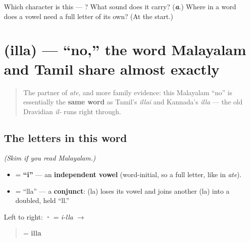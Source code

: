 \begin{tcolorbox}[breakable,colback=teal!4,colframe=teal!35!black,title={Before you move on}]
Which character is this — ? What sound does it carry? (\emph{\textbf{a}}.) Where in a word does a vowel need a full letter of its own? (At the start.)
\end{tcolorbox}
\section[\texorpdfstring{\ml{ഇല്ല} (illa)}{ഇല്ല (illa)}]{ (illa) — \textquotedblleft{}no,\textquotedblright{} the word Malayalam and Tamil share almost exactly}

\label{lesson:ML-C01-illa}



\begin{quote}
The partner of \emph{ate}, and more family evidence: this Malayalam \textquotedblleft{}no\textquotedblright{} is essentially the \textbf{same word} as Tamil's \emph{illai} and Kannada's \emph{illa} — the old Dravidian \emph{il-} runs right through.
\end{quote}

\subsection*{The letters in this word}
\emph{(Skim if you read Malayalam.)}

\begin{itemize}
\raggedright
  \item \textbf{} = \textbf{\textquotedblleft{}i\textquotedblright{}} — an \textbf{independent vowel} (word-initial, so a full letter, like \textbf{} in \emph{ate}).
  \item \textbf{} = \textquotedblleft{}lla\textquotedblright{} — a \textbf{conjunct}: \textbf{} (la) loses its vowel and joins another \textbf{} (la) into a doubled, held \textquotedblleft{}ll.\textquotedblright{}
\end{itemize}

Left to right: \textbf{ · } = \emph{i-lla} $\to$

\begin{quote}
\textbf{} = \textbf{illa}
\end{quote}

